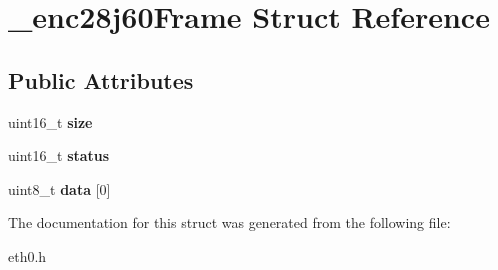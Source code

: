 \hypertarget{struct__enc28j60Frame}{}\section{\+\_\+enc28j60\+Frame Struct Reference}
\label{struct__enc28j60Frame}
\subsection*{Public Attributes}
\begin{DoxyCompactItemize}
\item 
\mbox{\label{struct__enc28j60Frame_a62cb7de85fcefe73e0ddb5006da221a7}} 
uint16\+\_\+t {\bfseries size}
\item 
\mbox{\label{struct__enc28j60Frame_a1833f4cb8b219df481491088095eb1d3}} 
uint16\+\_\+t {\bfseries status}
\item 
\mbox{\label{struct__enc28j60Frame_aba2c4ba29e5bced4008429f852c0a03a}} 
uint8\+\_\+t {\bfseries data} \mbox{[}0\mbox{]}
\end{DoxyCompactItemize}


The documentation for this struct was generated from the following file\+:\begin{DoxyCompactItemize}
\item 
eth0.\+h\end{DoxyCompactItemize}
